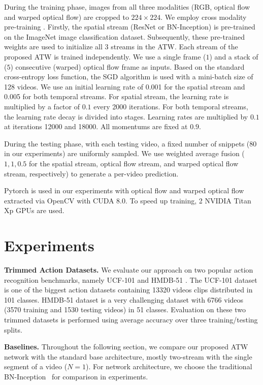 \documentclass[runningheads,a4paper]{llncs}
\begin{document}
During the training phase, images from all three modalities (RGB, optical flow and warped optical flow) are cropped to $224\times224$. We employ cross modality pre-training \cite{wang2016temporal}. Firstly, the spatial stream (ResNet or BN-Inception) is pre-trained on the ImageNet image classification dataset. Subsequently, these pre-trained weights are used to initialize all $3$ streams in the ATW. Each stream of the proposed ATW is trained independently. We use a single frame ($1$) and a stack of ($5$) consecutive (warped) optical flow frame as inputs. Based on the standard cross-entropy loss function, the SGD algorithm is used with a mini-batch size of 128 videos. We use an initial learning rate of 0.001 for the spatial stream and 0.005 for both temporal streams. For spatial stream, the learning rate is multiplied by a factor of $0.1$ every 2000 iterations. For both temporal streams, the learning rate decay is divided into stages. Learning rates are multiplied by $0.1$ at iterations 12000 and 18000. All momentums are fixed at $0.9$.

During the testing phase, with each testing video, a fixed number of snippets (80 in our experiments) are uniformly sampled. We use weighted average fusion ($1, 1, 0.5$ for the spatial stream, optical flow stream, and warped optical flow stream, respectively) to generate a per-video prediction.

Pytorch \cite{paszke2017pytorch} is used in our experiments with optical flow and warped optical flow extracted via OpenCV with CUDA 8.0. To speed up training, 2 NVIDIA Titan Xp GPUs are used.

\section{Experiments}
\noindent \textbf{Trimmed Action Datasets.} We evaluate our approach on two popular action recognition benchmarks, namely UCF-101
\cite{soomro2012ucf101} and HMDB-51 \cite{kuehne2013hmdb51}.
The UCF-101 dataset is one of the biggest action datasets containing 13320 videos
clips distributed in 101 classes. HMDB-51 dataset is a very challenging dataset with 6766 videos (3570 training and 1530 testing videos)
in 51 classes. Evaluation on these two trimmed datasets is performed using average accuracy over three training/testing splits.



\noindent \textbf{Baselines.} Throughout the following section, we compare our proposed ATW network with the standard base architecture, mostly
two-stream with the single segment of a video ($N=1$). For network architecture, we choose the
traditional BN-Inception~\cite{ioffe2015batch} for comparison in experiments.
\end{document}

